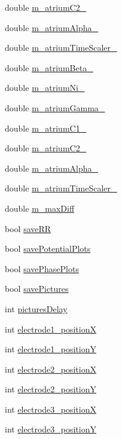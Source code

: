 \begin{DoxyCompactItemize}
\item 
double \hyperlink{classatrial_parameters_a050821c5d8eb5227b3fc20c6b8275334}{m\+\_\+atrium\+C2\+\_}
\item 
double \hyperlink{classatrial_parameters_a470b8d7cbf13f6779b32f9e1bfccf178}{m\+\_\+atrium\+Alpha\+\_}
\item 
double \hyperlink{classatrial_parameters_a1d7cc6803823cee9d9e8d3da9f22ecab}{m\+\_\+atrium\+Time\+Scaler\+\_}
\item 
double \hyperlink{classatrial_parameters_a0cf5b42ea2203b195d381faad54a2a6a}{m\+\_\+atrium\+Beta\+\_}
\item 
double \hyperlink{classatrial_parameters_a38d86db0fc77bc34d99206c2b356dd1c}{m\+\_\+atrium\+Ni\+\_}
\item 
double \hyperlink{classatrial_parameters_a433c3dea47b6148427120d0db44ce085}{m\+\_\+atrium\+Gamma\+\_}
\item 
double \hyperlink{classatrial_parameters_ab14d54b3d63d89b69438e0e498548d14}{m\+\_\+atrium\+C1\+\_}
\item 
double \hyperlink{classatrial_parameters_a1456151bc39a64424c68cdf4e4692612}{m\+\_\+atrium\+C2\+\_}
\item 
double \hyperlink{classatrial_parameters_ade32af22adbeb051703b1deccfdd1a52}{m\+\_\+atrium\+Alpha\+\_}
\item 
double \hyperlink{classatrial_parameters_a4d5912e29d39267a881f2ca5030c879f}{m\+\_\+atrium\+Time\+Scaler\+\_}
\item 
double \hyperlink{classatrial_parameters_a76aa606242b770cdc906093d0ddae353}{m\+\_\+max\+Diff}
\item 
bool \hyperlink{classatrial_parameters_af36f1f31c437df63e00b5d0d98afc6a4}{save\+R\+R}
\item 
bool \hyperlink{classatrial_parameters_abad2d832645988d1306b41ff0682a468}{save\+Potential\+Plots}
\item 
bool \hyperlink{classatrial_parameters_aef1eb255a92bf23d8213830777d589eb}{save\+Phase\+Plots}
\item 
bool \hyperlink{classatrial_parameters_a8ca46db58de6da7fc1c4e850c01c7bba}{save\+Pictures}
\item 
int \hyperlink{classatrial_parameters_a766f0331ef8ecf87beb6e7aa4925bd23}{pictures\+Delay}
\item 
int \hyperlink{classatrial_parameters_a44f5668473c695b3aa2ed0c4ebb9c29b}{electrode1\+\_\+position\+X}
\item 
int \hyperlink{classatrial_parameters_acd80064efc3a239b403182cb924df0ee}{electrode1\+\_\+position\+Y}
\item 
int \hyperlink{classatrial_parameters_a027e2b6f3c68a236396d959331870fbe}{electrode2\+\_\+position\+X}
\item 
int \hyperlink{classatrial_parameters_a24f980562239743387bf28ecec77b466}{electrode2\+\_\+position\+Y}
\item 
int \hyperlink{classatrial_parameters_a59a747cd77415eb3beb5f80b3ef9b2ce}{electrode3\+\_\+position\+X}
\item 
int \hyperlink{classatrial_parameters_a295e8d16e09fedea5046689b16bac8ff}{electrode3\+\_\+position\+Y}
\end{DoxyCompactItemize}


